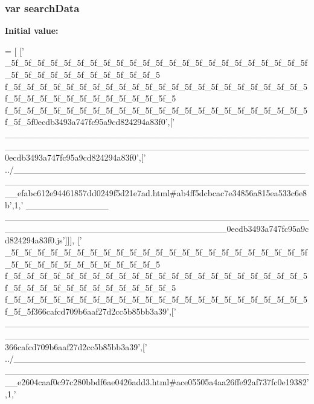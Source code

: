 \subsubsection[{search\+Data}]{\setlength{\rightskip}{0pt plus 5cm}var search\+Data}\label{variables__1_8js_ad01a7523f103d6242ef9b0451861231e}
{\bfseries Initial value\+:}
\begin{DoxyCode}
=
[
  [\textcolor{stringliteral}{'
      \_5f\_5f\_5f\_5f\_5f\_5f\_5f\_5f\_5f\_5f\_5f\_5f\_5f\_5f\_5f\_5f\_5f\_5f\_5f\_5f\_5f\_5f\_5f\_5f\_5f\_5f\_5f\_5f\_5f\_5f\_5f\_5f\_5f\_5f\_5
      f\_5f\_5f\_5f\_5f\_5f\_5f\_5f\_5f\_5f\_5f\_5f\_5f\_5f\_5f\_5f\_5f\_5f\_5f\_5f\_5f\_5f\_5f\_5f\_5f\_5f\_5f\_5f\_5f\_5f\_5f\_5f\_5f\_5f\_5f\_5f\_5
      f\_5f\_5f\_5f\_5f\_5f\_5f\_5f\_5f\_5f\_5f\_5f\_5f\_5f\_5f\_5f\_5f\_5f\_5f\_5f\_5f\_5f\_5f\_5f\_5f\_5f0ecdb3493a747fc95a9cd824294a83f0'},[\textcolor{stringliteral}{'
      \_\_\_\_\_\_\_\_\_\_\_\_\_\_\_\_\_\_\_\_\_\_\_\_\_\_\_\_\_\_\_\_\_\_\_\_\_\_\_\_\_\_\_\_\_\_\_\_\_\_\_\_\_\_\_\_\_\_\_\_\_\_\_\_\_\_\_\_\_\_\_\_\_\_\_\_\_\_\_\_\_\_\_\_\_\_\_\_\_\_\_\_\_\_\_\_0ecdb3493a747fc95a9cd824294a83f0'},[\textcolor{stringliteral}{'
      ../\_\_\_\_\_\_\_\_\_\_\_\_\_\_\_\_\_\_\_\_\_\_\_\_\_\_\_\_\_\_\_\_\_\_\_\_\_\_\_\_\_\_\_\_\_\_\_\_\_\_\_\_\_\_\_\_\_\_\_\_\_\_\_\_\_\_\_\_\_\_\_\_\_\_\_\_\_\_\_\_\_\_\_\_\_\_\_\_\_\_\_\_\_\_\_\_efabc612e94461857dd0249f5d21e7ad.html#ab4ff5dcbcac7e34856a815ea533c6e8b'},1,\textcolor{stringliteral}{'
      \_\_\_\_\_\_\_\_\_\_\_\_\_
      \_\_\_\_\_\_\_\_\_\_\_\_\_\_\_\_\_\_\_\_\_\_\_\_\_\_\_\_\_\_\_\_\_\_\_\_\_\_\_\_\_\_\_\_\_\_\_\_\_\_\_\_\_\_\_\_\_\_\_\_\_\_\_\_\_\_\_\_\_\_\_\_\_\_\_\_\_\_\_\_\_\_\_0ecdb3493a747fc95a9cd824294a83f0.js'}]]],
  [\textcolor{stringliteral}{'
      \_5f\_5f\_5f\_5f\_5f\_5f\_5f\_5f\_5f\_5f\_5f\_5f\_5f\_5f\_5f\_5f\_5f\_5f\_5f\_5f\_5f\_5f\_5f\_5f\_5f\_5f\_5f\_5f\_5f\_5f\_5f\_5f\_5f\_5f\_5
      f\_5f\_5f\_5f\_5f\_5f\_5f\_5f\_5f\_5f\_5f\_5f\_5f\_5f\_5f\_5f\_5f\_5f\_5f\_5f\_5f\_5f\_5f\_5f\_5f\_5f\_5f\_5f\_5f\_5f\_5f\_5f\_5f\_5f\_5f\_5f\_5
      f\_5f\_5f\_5f\_5f\_5f\_5f\_5f\_5f\_5f\_5f\_5f\_5f\_5f\_5f\_5f\_5f\_5f\_5f\_5f\_5f\_5f\_5f\_5f\_5f\_5f366cafcd709b6aaf27d2cc5b85bb3a39'},[\textcolor{stringliteral}{'
      \_\_\_\_\_\_\_\_\_\_\_\_\_\_\_\_\_\_\_\_\_\_\_\_\_\_\_\_\_\_\_\_\_\_\_\_\_\_\_\_\_\_\_\_\_\_\_\_\_\_\_\_\_\_\_\_\_\_\_\_\_\_\_\_\_\_\_\_\_\_\_\_\_\_\_\_\_\_\_\_\_\_\_\_\_\_\_\_\_\_\_\_\_\_\_\_366cafcd709b6aaf27d2cc5b85bb3a39'},[\textcolor{stringliteral}{'
      ../\_\_\_\_\_\_\_\_\_\_\_\_\_\_\_\_\_\_\_\_\_\_\_\_\_\_\_\_\_\_\_\_\_\_\_\_\_\_\_\_\_\_\_\_\_\_\_\_\_\_\_\_\_\_\_\_\_\_\_\_\_\_\_\_\_\_\_\_\_\_\_\_\_\_\_\_\_\_\_\_\_\_\_\_\_\_\_\_\_\_\_\_\_\_\_\_e2604caaf0c97c280bbdf6ae0426add3.html#ace05505a4aa26ffe92af737fc0e19382'},1,\textcolor{stringliteral}{'
}
\end{DoxyCode}
